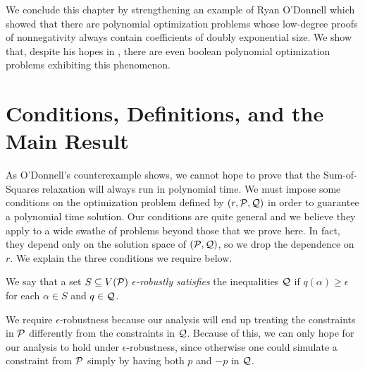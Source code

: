 We conclude this chapter by strengthening an example of Ryan O'Donnell which showed that there are polynomial optimization problems whose low-degree proofs of nonnegativity always contain coefficients of doubly exponential size. We show that, despite his hopes in \cite{}, there are even boolean polynomial optimization problems exhibiting this phenomenon. 

\section{Conditions, Definitions, and the Main Result}
As O'Donnell's counterexample shows, we cannot hope to prove that the Sum-of-Squares relaxation will always run in polynomial time. We must impose some conditions on the optimization problem defined by $(r, \mathcal P, \mathcal Q)$ in order to guarantee a polynomial time solution. Our conditions are quite general and we believe they apply to a wide swathe of problems beyond those that we prove here. In fact, they depend only on the solution space of $(\mathcal P, \mathcal Q)$, so we drop the dependence on $r$. We explain the three conditions we require below.

\begin{definition}
We say that a set $S \subseteq V(\mathcal P)$ \emph{$\epsilon$-robustly satisfies} the inequalities $\mathcal Q$ if $q(\alpha) \geq \epsilon$ for each $\alpha \in S$ and $q \in \mathcal Q$. 
\end{definition}
We require $\epsilon$-robustness because our analysis will end up treating the constraints in $\mathcal P$ differently from the constraints in $\mathcal Q$.
Because of this, we can only hope for our analysis to hold under $\epsilon$-robustness, since otherwise one could simulate a constraint from $\mathcal P$ simply by having both $p$ and $-p$ in $\mathcal Q$. 

